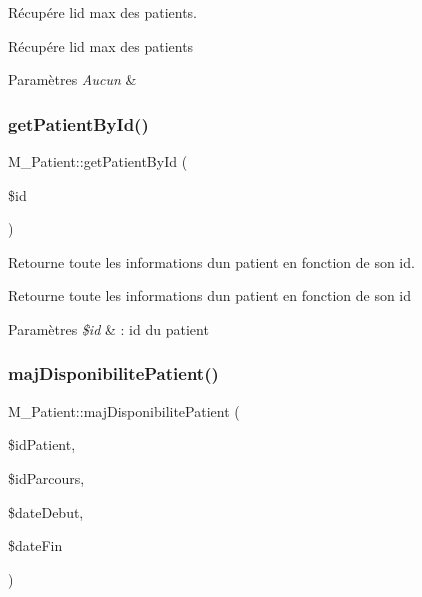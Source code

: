 Récupére l\textquotesingle{}id max des patients. 

Récupére l\textquotesingle{}id max des patients 
\begin{DoxyParams}{Paramètres}
{\em Aucun} & \\
\hline
\end{DoxyParams}
\mbox{\label{class_m___patient_aac67ed7396fd641e440458843e24f8f5}} 
\subsubsection{\texorpdfstring{get\+Patient\+By\+Id()}{getPatientById()}}
{\footnotesize\ttfamily M\+\_\+\+Patient\+::get\+Patient\+By\+Id (\begin{DoxyParamCaption}\item[{}]{\$id }\end{DoxyParamCaption})}



Retourne toute les informations d\textquotesingle{}un patient en fonction de son id. 

Retourne toute les informations d\textquotesingle{}un patient en fonction de son id 
\begin{DoxyParams}{Paramètres}
{\em \$id} & \+: id du patient \\
\hline
\end{DoxyParams}
\mbox{\label{class_m___patient_aad31452d1a9feb24d210dd6c5b7d8889}} 
\subsubsection{\texorpdfstring{maj\+Disponibilite\+Patient()}{majDisponibilitePatient()}}
{\footnotesize\ttfamily M\+\_\+\+Patient\+::maj\+Disponibilite\+Patient (\begin{DoxyParamCaption}\item[{}]{\$id\+Patient,  }\item[{}]{\$id\+Parcours,  }\item[{}]{\$date\+Debut,  }\item[{}]{\$date\+Fin }\end{DoxyParamCaption})}



